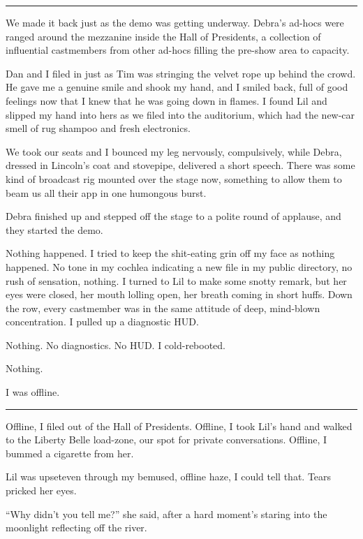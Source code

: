 \begin{center}\rule{1in}{0.4pt}\end{center}

We made it back just as the demo was getting underway. Debra's
ad-hocs were ranged around the mezzanine inside the Hall of
Presidents, a collection of influential castmembers from other
ad-hocs filling the pre-show area to capacity.

Dan and I filed in just as Tim was stringing the velvet rope up
behind the crowd. He gave me a genuine smile and shook my hand, and
I smiled back, full of good feelings now that I knew that he was
going down in flames. I found Lil and slipped my hand into hers as
we filed into the auditorium, which had the new-car smell of rug
shampoo and fresh electronics.

We took our seats and I bounced my leg nervously, compulsively,
while Debra, dressed in Lincoln's coat and stovepipe, delivered a
short speech. There was some kind of broadcast rig mounted over the
stage now, something to allow them to beam us all their app in one
humongous burst.

Debra finished up and stepped off the stage to a polite round of
applause, and they started the demo.

Nothing happened. I tried to keep the shit-eating grin off my face
as nothing happened. No tone in my cochlea indicating a new file in
my public directory, no rush of sensation, nothing. I turned to Lil
to make some snotty remark, but her eyes were closed, her mouth
lolling open, her breath coming in short huffs. Down the row, every
castmember was in the same attitude of deep, mind-blown
concentration. I pulled up a diagnostic HUD.

Nothing. No diagnostics. No HUD. I cold-rebooted.

Nothing.

I was offline.

\begin{center}\rule{1in}{0.4pt}\end{center}

Offline, I filed out of the Hall of Presidents. Offline, I took
Lil's hand and walked to the Liberty Belle load-zone, our spot for
private conversations. Offline, I bummed a cigarette from her.

Lil was upset{\dash}even through my bemused, offline haze, I could tell
that. Tears pricked her eyes.

“Why didn't you tell me?” she said, after a hard moment's staring
into the moonlight reflecting off the river.

